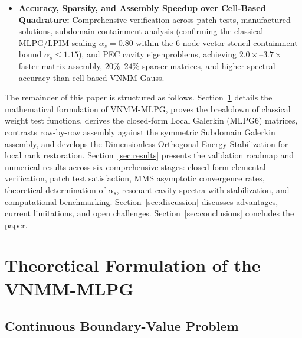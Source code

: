 \documentclass[VANCOUVER,Times1COL]{WileyNJD-v5}
\begin{document}
\begin{itemize}
    \item \textbf{Accuracy, Sparsity, and Assembly Speedup over Cell-Based Quadrature:} Comprehensive verification across patch tests, manufactured solutions, subdomain containment analysis (confirming the classical MLPG/LPIM scaling $\alpha_s = 0.80$ \cite{atluri2002meshless, liu2009mesh} within the 6-node vector stencil containment bound $\alpha_s \le 1.15$), and PEC cavity eigenproblems, achieving $2.0\times\text{--}3.7\times$ faster matrix assembly, $20\%\text{--}24\%$ sparser matrices, and higher spectral accuracy than cell-based VNMM-Gauss.
\end{itemize}

The remainder of this paper is structured as follows. Section~\ref{sec:formulation} details the mathematical formulation of VNMM-MLPG, proves the breakdown of classical weight test functions, derives the closed-form Local Galerkin (MLPG6) matrices, contrasts row-by-row assembly against the symmetric Subdomain Galerkin assembly, and develops the Dimensionless Orthogonal Energy Stabilization for local rank restoration. Section~\ref{sec:results} presents the validation roadmap and numerical results across six comprehensive stages: closed-form elemental verification, patch test satisfaction, MMS asymptotic convergence rates, theoretical determination of $\alpha_s$, resonant cavity spectra with stabilization, and computational benchmarking. Section~\ref{sec:discussion} discusses advantages, current limitations, and open challenges. Section~\ref{sec:conclusions} concludes the paper.

\section{Theoretical Formulation of the VNMM-MLPG}
\label{sec:formulation}

\subsection{Continuous Boundary-Value Problem}
\label{subsec:continuous_bvp}
\end{document}
